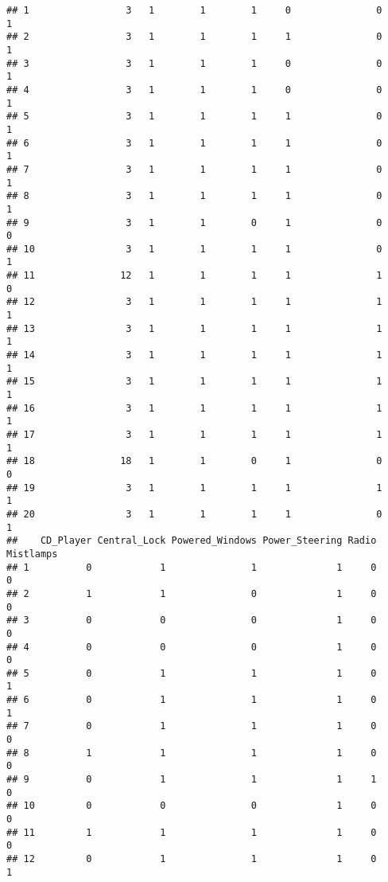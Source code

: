 \documentclass[
]{article}
\begin{document}
\begin{verbatim}
## 1                 3   1        1        1     0               0             1
## 2                 3   1        1        1     1               0             1
## 3                 3   1        1        1     0               0             1
## 4                 3   1        1        1     0               0             1
## 5                 3   1        1        1     1               0             1
## 6                 3   1        1        1     1               0             1
## 7                 3   1        1        1     1               0             1
## 8                 3   1        1        1     1               0             1
## 9                 3   1        1        0     1               0             0
## 10                3   1        1        1     1               0             1
## 11               12   1        1        1     1               1             0
## 12                3   1        1        1     1               1             1
## 13                3   1        1        1     1               1             1
## 14                3   1        1        1     1               1             1
## 15                3   1        1        1     1               1             1
## 16                3   1        1        1     1               1             1
## 17                3   1        1        1     1               1             1
## 18               18   1        1        0     1               0             0
## 19                3   1        1        1     1               1             1
## 20                3   1        1        1     1               0             1
##    CD_Player Central_Lock Powered_Windows Power_Steering Radio Mistlamps
## 1          0            1               1              1     0         0
## 2          1            1               0              1     0         0
## 3          0            0               0              1     0         0
## 4          0            0               0              1     0         0
## 5          0            1               1              1     0         1
## 6          0            1               1              1     0         1
## 7          0            1               1              1     0         0
## 8          1            1               1              1     0         0
## 9          0            1               1              1     1         0
## 10         0            0               0              1     0         0
## 11         1            1               1              1     0         0
## 12         0            1               1              1     0         1

\end{verbatim}
\end{document}
